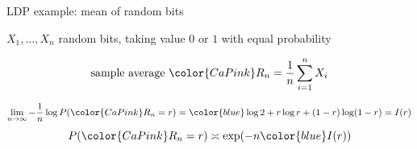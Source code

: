 \documentclass{beamer}
\begin{document}
%
%
%
%
%

\begin{frame}[t]{LDP example: mean of random bits}

\begin{center}
$X_1, \ldots, X_n$ random bits, taking value $0$ or $1$ with equal probability
\end{center}

\begin{equation}
\text{sample average}~ {\color{CaPink} R_n} = \frac{1}{n} \sum_{i=1}^n X_i
\end{equation}

\pause
\return
\begin{equation}
\lim_{n \rightarrow \infty} - \frac{1}{n} \log P({\color{CaPink} R_n} = r) = {\color{blue} \log 2 + r \log r + (1 - r) \log(1 - r) = I(r)}
\end{equation}
\begin{equation}
P({\color{CaPink} R_n} = r) \asymp \exp(- n {\color{blue} I}(r))
\end{equation}



\end{frame}
\end{document}
